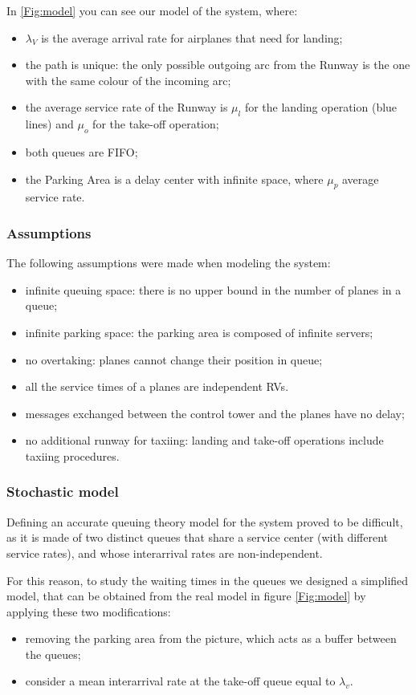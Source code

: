 \documentclass[12pt]{article}
\begin{document}
In \cref{Fig:model} you can see our model of the system, where:
\begin{itemize}
    \item $\lambda_V$ is the average arrival rate for airplanes that need for landing;
    \item the path is unique: the only possible outgoing arc from the Runway is the one with the same colour of the incoming arc;
    \item the average service rate of the Runway is $\mu_l$ for the landing operation (blue lines) and $\mu_o$ for the take-off operation;
    \item both queues are FIFO;
    \item the Parking Area is a delay center with infinite space, where $\mu_p$ average service rate.
\end{itemize}

\subsubsection{Assumptions}
The following assumptions were made when modeling the system:
\begin{itemize}
	\item infinite queuing space: there is no upper bound in the number of planes in a queue;
	\item infinite parking space: the parking area is composed of infinite servers;
	\item no overtaking: planes cannot change their position in queue;
	\item all the service times of a planes are independent RVs.
	\item messages exchanged between the control tower and the planes have no delay;
	\item no additional runway for taxiing: landing and take-off operations include taxiing procedures.
\end{itemize}

\subsubsection{Stochastic model}\label{stoch}

Defining an accurate queuing theory model for the system proved to be difficult, as it is made of two distinct queues that share a service center (with different service rates), and whose interarrival rates are non-independent.

For this reason, to study the waiting times in the queues we designed a simplified model, that can be obtained from the real model in figure \ref{Fig:model} by applying these two modifications:
\begin{itemize}
    \item removing the parking area from the picture, which acts as a buffer between the queues;
    \item consider a mean interarrival rate at the take-off queue equal to $\lambda_v$.
\end{itemize}
\end{document}
